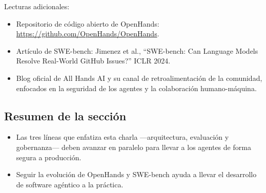 \documentclass[a4paper]{article}
\begin{document}
Lecturas adicionales:
\begin{itemize}
    \item Repositorio de código abierto de OpenHands: \href{https://github.com/OpenHands/OpenHands}{https://github.com/OpenHands/OpenHands}.
    \item Artículo de SWE-bench: Jimenez et al., ``SWE-bench: Can Language Models Resolve Real-World GitHub Issues?'' ICLR 2024.
    \item Blog oficial de All Hands AI y su canal de retroalimentación de la comunidad, enfocados en la seguridad de los agentes y la colaboración humano-máquina.
\end{itemize}

\subsection{Resumen de la sección}
\begin{itemize}
    \item Las tres líneas que enfatiza esta charla —arquitectura, evaluación y gobernanza— deben avanzar en paralelo para llevar a los agentes de forma segura a producción.
    \item Seguir la evolución de OpenHands y SWE-bench ayuda a llevar el desarrollo de software agéntico a la práctica.
\end{itemize}
\end{document}
